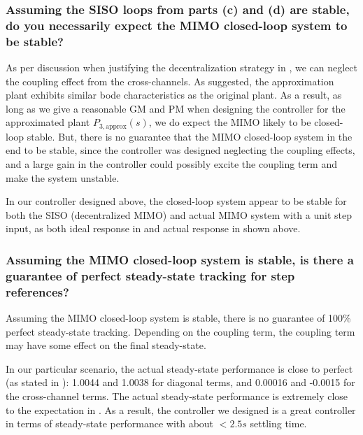 \documentclass{tron}
\newcommand{\apx}{\text{approx}}
\begin{document}
\subsubsection{Assuming the SISO loops from parts (c) and (d) are stable, do you necessarily expect the MIMO closed-loop system to be stable?}
As per discussion when justifying the decentralization strategy in , we can neglect the coupling effect from the cross-channels. As  suggested, the approximation plant exhibits similar bode characteristics as the original plant. As a result, as long as we give a reasonable GM and PM when designing the controller for the approximated plant $P_{3, \apx}(s)$, we do expect the MIMO likely to be closed-loop stable. But, there is no guarantee that the MIMO closed-loop system in the end to be stable, since the controller was designed neglecting the coupling effects, and a large gain in the controller could possibly excite the coupling term and make the system unstable.

In our controller designed above, the closed-loop system appear to be stable for both the SISO (decentralized MIMO) and actual MIMO system with a unit step input, as both ideal response in  and actual response in  shown above.

\subsubsection{Assuming the MIMO closed-loop system is stable, is there a guarantee of perfect steady-state tracking for step references?}
Assuming the MIMO closed-loop system is stable, there is no guarantee of 100\% perfect steady-state tracking. Depending on the coupling term, the coupling term may have some effect on the final steady-state. 

In our particular scenario, the actual steady-state performance is close to perfect (as stated in ): 1.0044 and 1.0038 for diagonal terms, and 0.00016 and -0.0015 for the cross-channel terms. The actual steady-state performance is extremely close to the expectation in . As a result, the controller we designed is a great controller in terms of steady-state performance with about $<2.5 \unit{s}$ settling time.
\end{document}
